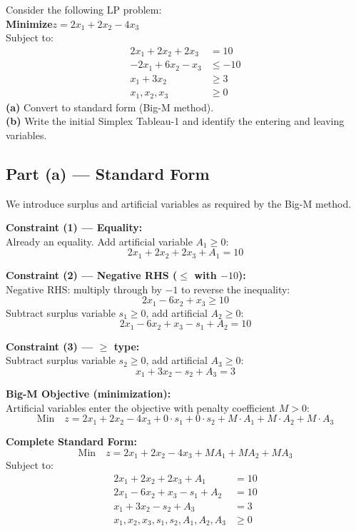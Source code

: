 \documentclass[12pt]{article}
\begin{document}
\begin{problembox}
Consider the following LP problem:\\[6pt]
\textbf{Minimize}\quad $z = 2x_1 + 2x_2 - 4x_3$\\[4pt]
Subject to:
\begin{align*}
  2x_1 + 2x_2 + 2x_3 &= 10 \tag{1}\\
  -2x_1 + 6x_2 - x_3 &\leq -10 \tag{2}\\
  x_1 + 3x_2 &\geq 3 \tag{3}\\
  x_1, x_2, x_3 &\geq 0
\end{align*}
\textbf{(a)} Convert to standard form (Big-M method).\\
\textbf{(b)} Write the initial Simplex Tableau-1 and identify the entering and leaving variables.
\end{problembox}

\subsection*{Part (a) --- Standard Form}

We introduce surplus and artificial variables as required by the Big-M method.

\medskip
\noindent\textbf{Constraint (1) --- Equality:}\\
Already an equality. Add artificial variable $A_1 \geq 0$:
\[
  2x_1 + 2x_2 + 2x_3 + A_1 = 10
\]

\medskip
\noindent\textbf{Constraint (2) --- Negative RHS ($\leq$ with $-10$):}\\
Negative RHS: multiply through by $-1$ to reverse the inequality:
\[
  2x_1 - 6x_2 + x_3 \geq 10
\]
Subtract surplus variable $s_1 \geq 0$, add artificial $A_2 \geq 0$:
\[
  2x_1 - 6x_2 + x_3 - s_1 + A_2 = 10
\]

\medskip
\noindent\textbf{Constraint (3) --- $\geq$ type:}\\
Subtract surplus variable $s_2 \geq 0$, add artificial $A_3 \geq 0$:
\[
  x_1 + 3x_2 - s_2 + A_3 = 3
\]

\medskip
\noindent\textbf{Big-M Objective (minimization):}\\
Artificial variables enter the objective with penalty coefficient $M > 0$:
\[
  \text{Min}\quad z = 2x_1 + 2x_2 - 4x_3 + 0{\cdot}s_1 + 0{\cdot}s_2 + M{\cdot}A_1 + M{\cdot}A_2 + M{\cdot}A_3
\]

\begin{formulabox}
\textbf{Complete Standard Form:}\\[6pt]
\[
  \text{Min}\quad z = 2x_1 + 2x_2 - 4x_3 + M A_1 + M A_2 + M A_3
\]
Subject to:
\begin{align*}
  2x_1 + 2x_2 + 2x_3 + A_1 &= 10\\
  2x_1 - 6x_2 + x_3 - s_1 + A_2 &= 10\\
  x_1 + 3x_2 - s_2 + A_3 &= 3\\
  x_1, x_2, x_3, s_1, s_2, A_1, A_2, A_3 &\geq 0
\end{align*}
\end{formulabox}
\end{document}
